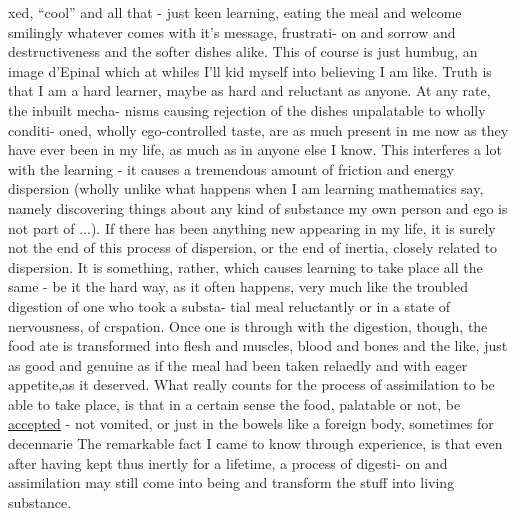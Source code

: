 
xed, ``cool'' and all that - just keen  learning,  eating the
meal and welcome smilingly whatever comes with it's message, frustrati-%
on and sorrow and destructiveness and the softer dishes alike. This of
course is just humbug, an image d'Epinal which at whiles I'll kid 
myself into believing I am like. Truth is that I am a hard learner,
maybe as hard and reluctant as anyone. At any rate, the inbuilt mecha-%
nisms causing rejection of the dishes unpalatable to  wholly conditi-%
oned, wholly ego-controlled taste, are as much present in me now as
they have ever been in my life,  as much as in anyone else I know. This
interferes a lot with the learning - it causes a tremendous amount of
friction and energy dispersion (wholly unlike what happens when I am
learning mathematics say, namely discovering things about any kind of
substance  my own person and ego is not part of ...). If there
has been anything new appearing in my life, it is surely not the end
of this process of dispersion, or the end of inertia, closely related
to dispersion. It is something, rather, which causes learning to take
place all the same - be it the hard way, as it often happens, very
much like the troubled digestion of one who took  a substa-%
tial meal reluctantly or in a state of nervousness, of crspation.
Once  one is through with the digestion, though, the food  ate
is transformed into flesh and muscles, blood and bones and the like,
just as good and genuine as if the meal had been taken relaedly and
with eager appetite,\hand{|}as it deserved. What really counts for the process
of assimilation to be able to take place, is that in a certain sense
the food, palatable or not, be \uline{accepted} - not vomited, or just
 in the bowels like a foreign body, sometimes for decennarie
The remarkable fact I came to know through experience, is that even
after having  kept thus inertly for a lifetime, a process of digesti-%
on and assimilation may still come into being and transform the  stuff
into living substance.

